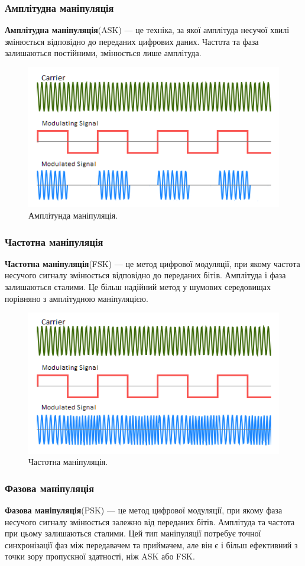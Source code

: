 \documentclass{article}
\begin{document}
\subsubsection{Амплітудна маніпуляція}
\textbf{Амплітудна маніпуляція}(ASK) --- це техніка, за якої амплітуда несучої хвилі змінюється відповідно до переданих цифрових даних. Частота та фаза залишаються постійними, змінюється лише амплітуда. 

\begin{figure}[h!]
	\centering
	\includegraphics[width=0.6\linewidth]{images/ask.png}
	\caption{\label{fig:ask}Амплітунда маніпуляція.}
\end{figure}

\subsubsection{Частотна маніпуляція}
\textbf{Частотна маніпуляція}(FSK) --- це метод цифрової модуляції, при якому частота несучого сигналу змінюється відповідно до переданих бітів. Амплітуда і фаза залишаються сталими. Це більш надійний метод у шумових середовищах порівняно з амплітудною маніпуляцією.

\begin{figure}[h!]
	\centering
	\includegraphics[width=0.6\linewidth]{images/fsk.png}
	\caption{\label{fig:fsk}Частотна маніпуляція.}
\end{figure}

\subsubsection{Фазова маніпуляція}
\textbf{Фазова маніпуляція}(PSK) --- це метод цифрової модуляції, при якому фаза несучого сигналу змінюється залежно від переданих бітів. Амплітуда та частота при цьому залишаються сталими. Цей тип маніпуляції потребує точної синхронізації фаз між передавачем та приймачем, але він є і більш ефективний з точки зору пропускної здатності, ніж ASK або FSK.
\end{document}
